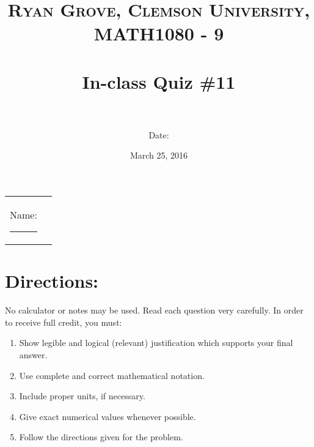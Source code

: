 \documentclass[paper=a4, fontsize=11pt]{scrartcl} %
\title{	
\normalfont \normalsize 
\textsc{Ryan Grove, Clemson University, MATH1080 - 9} \\ [25pt] %
\horrule{0.5pt} \\[0.4cm] %
\huge In-class Quiz \#11 \\ %
\horrule{2pt} \\[0.5cm] %
}
\author{Date:} %
\date{\normalsize March 25, 2016} %
\numberwithin{equation}{section} %
\numberwithin{figure}{section} %
\numberwithin{table}{section} %
\begin{document}
\maketitle %

\begin{flushleft}
\begin{tabular}{l l}
Name: \rule{3.2in}{.01cm}  & {}%
\end{tabular}
\end{flushleft}


\section*{\textbf{Directions:}}

No calculator or notes may be used.  Read each question very carefully.  In order to receive full credit, you must:
\begin{enumerate}
\item Show legible and logical (relevant) justification which supports your final answer.
\item Use complete and correct mathematical notation.
\item Include proper units, if necessary.
\item Give exact numerical values whenever possible.
\item Follow the directions given for the problem.
\end{enumerate}
\vspace{.1in}

\newpage
\end{document}
